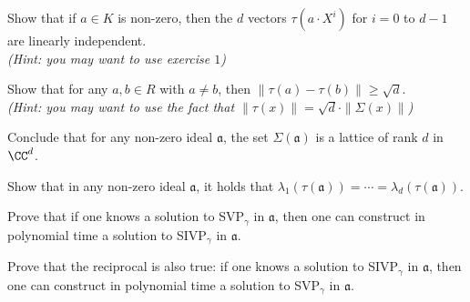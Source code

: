 \documentclass[11pt]{exam}
\theoremstyle{definition}
\begin{document}
\begin{questions}
\question Show that if $a \in K$ is non-zero, then the $d$ vectors $\tau(a \cdot X^i)$ for $i = 0$ to ${d-1}$ are linearly independent. \\
\textit{\color{gray}(Hint: you may want to use exercise $1$)}

\question Show that for any $a,b \in R$ with $a \neq b$, then $\|\tau(a) - \tau(b)\| \geq \sqrt{d}$. \\
\textit{\color{gray}(Hint: you may want to use the fact that $\|\tau(x)\| = \sqrt{d} \cdot \|\Sigma(x)\|$)}

\question Conclude that for any non-zero ideal $\mathfrak{a}$, the set $\Sigma(\mathfrak{a})$ is a lattice of rank $d$ in $\CC^d$.

\question Show that in any non-zero ideal $\mathfrak{a}$, it holds that $\lambda_1(\tau(\mathfrak{a})) = \cdots = \lambda_d(\tau(\mathfrak{a}))$.

\question Prove that if one knows a solution to SVP$_\gamma$ in $\mathfrak{a}$, then one can construct in polynomial time a solution to SIVP$_\gamma$ in $\mathfrak{a}$.


\question Prove that the reciprocal is also true: if one knows a solution to SIVP$_\gamma$ in $\mathfrak{a}$, then one can construct in polynomial time a solution to SVP$_\gamma$ in $\mathfrak{a}$.

\end{questions}
\end{document}
